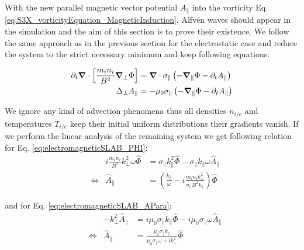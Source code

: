 With the new parallel magnetic vector potential $A_\parallel$ into the vorticity Eq. \ref{eq:S3X_vorticityEquation_MagneticInduction}, Alfvén waves should appear in the simulation and the aim of this section is to prove their existence. We follow the same approach as in the previous section for the electrostatic case and reduce the system to the strict necessary minimum and keep following equations: 

\begin{align}
	\partial_t\grad\cdot\left[\frac{m_in_i}{B^2}\grad_\perp\Phi\right] &= \grad\cdot\sigma_\parallel\left(-\grad_\parallel\Phi-\partial_tA_\parallel\right) \label{eq:electromagneticSLAB_PHI} \\
	\Delta_{\perp}A_\parallel &= -\mu_0\sigma_\parallel\left(-\grad_\parallel\Phi-\partial_tA_\parallel\right) \label{eq:electromagneticSLAB_APara}
\end{align}

We ignore any kind of advection phenomena thus all densities $n_{i/e}$ and temperatures $T_{i/e}$ keep their initial uniform distributions their gradients vanish. If we perform the linear analysis of the remaining system we get following relation for Eq. \ref{eq:electromagneticSLAB_PHI}:
\begin{align*}
	&&i\frac{m_in_i}{B^2}k_\perp^2\omega\hat{\Phi} &= \sigma_\parallel k_\parallel^2\hat{\Phi}-\sigma_\parallel k_\parallel\omega\hat{A}_\parallel \\
	&\Leftrightarrow& \hat{A}_\parallel &= \left(\frac{k_\parallel}{\omega} - i\frac{m_in_ik_\perp^2}{\sigma_\parallel B^2k_\parallel}\right)\hat{\Phi}
\end{align*}

and for Eq. \ref{eq:electromagneticSLAB_APara}:
\begin{align*}
	&&-k_\perp^2\hat{A}_\parallel &= i\mu_0\sigma_\parallel k_\parallel\hat{\Phi} - i\mu_0\sigma_\parallel\omega\hat{A}_\parallel \\
	&\Leftrightarrow&\hat{A}_\parallel &= \frac{\mu_0\sigma_\parallel k_\parallel}{\mu_0\sigma_\parallel\omega + i k_\perp^2}\hat{\Phi}
\end{align*}

